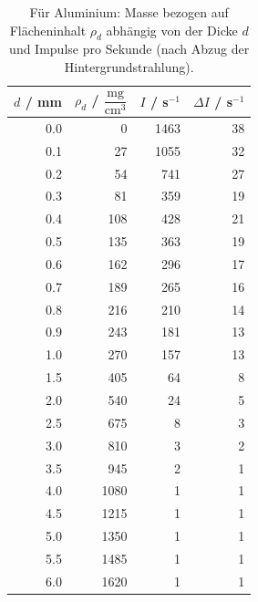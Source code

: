 \documentclass{article}
\begin{document}
\begin{table}[H]
\caption{Für Aluminium: Masse bezogen auf Flächeninhalt $\rho_d$ abhängig von der Dicke $d$ und Impulse pro Sekunde (nach Abzug der Hintergrundstrahlung). }
\begin{tabular}{rrrr}
$d$ / mm & $\rho_d$ / $\dfrac{\text{mg}}{\text{cm}^3}$ & $I$ / s$^{-1}$ & $\Delta I$ / s$^{-1}$ \\
\hline
0.0      &      0        &      1463     &      38 \\
0.1      &      27       &      1055     &      32 \\
0.2      &      54       &      741      &      27 \\
0.3      &      81       &      359      &      19 \\
0.4      &      108      &      428      &      21 \\
0.5      &      135      &      363      &      19 \\
0.6      &      162      &      296      &      17 \\
0.7      &      189      &      265      &      16 \\
0.8      &      216      &      210      &      14 \\
0.9      &      243      &      181      &      13 \\
1.0      &      270      &      157      &      13 \\
1.5      &      405      &      64       &      8 \\
2.0      &      540      &      24       &      5 \\
2.5      &      675      &      8        &      3 \\
3.0      &      810      &      3        &      2 \\
3.5      &      945      &      2        &      1 \\
4.0      &      1080     &      1        &      1 \\
4.5      &      1215     &      1        &      1 \\
5.0      &      1350     &      1        &      1 \\
5.5      &      1485     &      1        &      1 \\
6.0      &      1620     &      1        &      1 
\end{tabular}
\end{table}
\end{document}
